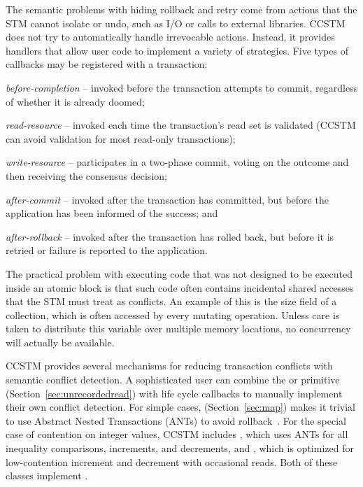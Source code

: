 The semantic problems with hiding rollback and retry come
from actions that the STM cannot isolate or undo, such as I/O or calls to
external libraries.
CCSTM does not try to automatically handle irrevocable actions.  Instead,
it provides handlers that allow user code to implement a variety of
strategies.  Five types of callbacks may be registered with a transaction:
\begin{packed_itemize}

\item{\it before-completion} -- invoked before the transaction attempts to
commit, regardless of whether it is already doomed;

\item{\it read-resource} -- invoked each time the transaction's read
set is validated (CCSTM can avoid validation for
most read-only transactions);

\item{\it write-resource} -- participates in a two-phase commit, voting on the
outcome and then receiving the consensus decision;

\item{\it after-commit} -- invoked after the transaction has committed, but
before the application has been informed of the success; and

\item{\it after-rollback} -- invoked after the transaction has rolled back, but
before it is retried or failure is reported to the application.

\end{packed_itemize}

The practical problem with executing code that was not designed to
be executed inside an atomic block is that such code often contains
incidental shared accesses that the STM must treat as conflicts.
An example of this is the size field of a collection, which is often
accessed by every mutating operation.  Unless care is taken to distribute
this variable over multiple memory locations, no concurrency will actually
be available.

CCSTM provides several mechanisms for reducing transaction conflicts with
semantic conflict detection.  A sophisticated user can combine the
 or  primitive (Section~\ref{sec:unrecordedread}) with
life cycle callbacks to manually implement their own conflict detection.
For simple cases,  (Section~\ref{sec:map})
makes it trivial to use Abstract Nested Transactions (ANTs) to avoid
rollback~\cite{harris07abstract}.  For the special case of contention
on integer values, CCSTM includes , which
uses ANTs for all inequality comparisons, increments, and decrements, and
, which is optimized for low-contention increment
and decrement with occasional reads.  Both of these classes implement
.

